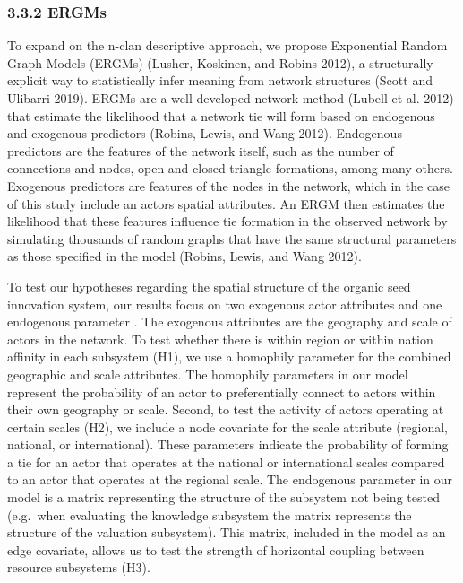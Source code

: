 \documentclass[twoside,12pt,final]{ucthesis-CA2012}
\begin{document}
\begin{ucmainmatter}
\hypertarget{ergms}{%
\subsubsection{3.3.2 ERGMs}\label{ergms}}

To expand on the n-clan descriptive approach, we propose Exponential
Random Graph Models (ERGMs) (Lusher, Koskinen, and Robins
2012), a structurally
explicit way to statistically infer meaning from network structures
(Scott and Ulibarri 2019).
ERGMs are a well-developed network method (Lubell et al.
2012) that estimate the
likelihood that a network tie will form based on endogenous and
exogenous predictors (Robins, Lewis, and Wang
2012). Endogenous
predictors are the features of the network itself, such as the number of
connections and nodes, open and closed triangle formations, among many
others. Exogenous predictors are features of the nodes in the network,
which in the case of this study include an actors\textquotesingle{} spatial attributes.
An ERGM then estimates the likelihood that these features influence tie
formation in the observed network by simulating thousands of random
graphs that have the same structural parameters as those specified in
the model (Robins, Lewis, and Wang
2012).

To test our hypotheses regarding the spatial structure of the organic
seed innovation system, our results focus on two exogenous actor
attributes and one endogenous parameter . The exogenous attributes are
the geography and scale of actors in the network. To test whether there
is within region or within nation affinity in each subsystem (H1), we
use a \textquotesingle homophily\textquotesingle{} parameter for the combined geographic and scale
attributes. The homophily parameters in our model represent the
probability of an actor to preferentially connect to actors within their
own geography or scale. Second, to test the activity of actors operating
at certain scales (H2), we include a node covariate for the scale
attribute (regional, national, or international). These parameters
indicate the probability of forming a tie for an actor that operates at
the national or international scales compared to an actor that operates
at the regional scale. The endogenous parameter in our model is a matrix
representing the structure of the subsystem not being tested (e.g.~when
evaluating the knowledge subsystem the matrix represents the structure
of the valuation subsystem). This matrix, included in the model as an
edge covariate, allows us to test the strength of horizontal coupling
between resource subsystems (H3).


\end{ucmainmatter}
\end{document}
